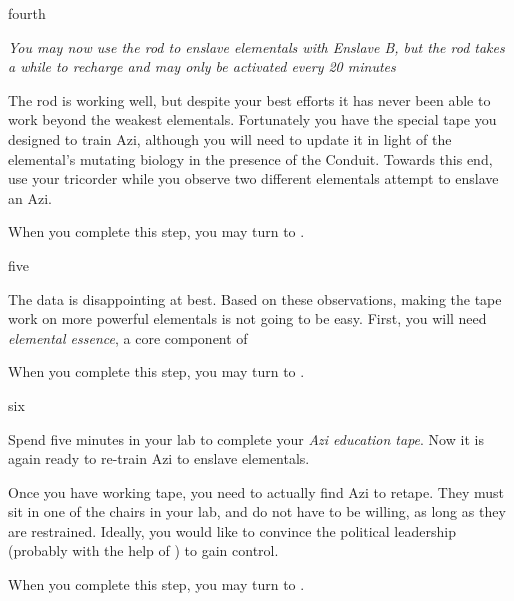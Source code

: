 \documentclass[notebook]{elementals}
\begin{document}
\begin{page}{fourth}

\emph{You may now use the rod to enslave elementals with Enslave B, but the rod takes a while to recharge and may only be activated every 20 minutes}

The rod is working well, but despite your best efforts it has never been able to work beyond the weakest elementals. Fortunately you have the special tape you designed to train Azi, although you will need to update it in light of the elemental's mutating biology in the presence of the Conduit. Towards this end, use your tricorder while you observe two different elementals attempt to enslave an Azi.

When you complete this step, you may turn to .

\end{page}

\begin{page}{five}

The data is disappointing at best. Based on these observations, making the tape work on more powerful elementals is not going to be easy. First, you will need \emph{elemental essence}, a core component of

When you complete this step, you may turn to .

\end{page}

\begin{page}{six}

Spend five minutes in your lab to complete your \emph{Azi education tape}. Now it is again ready to re-train Azi to enslave elementals.

Once you have working tape, you need to actually find Azi to retape. They must sit in one of the chairs in your lab, and do not have to be willing, as long as they are restrained. Ideally, you would like to convince the political leadership (probably with the help of \cDema{}) to gain control.

When you complete this step, you may turn to .

\end{page}

\endnotebook
\end{document}
